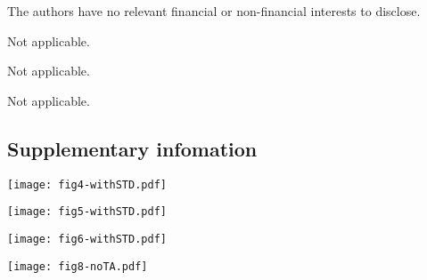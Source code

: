 \documentclass[pdflatex,referee,iicol,sn-basic]{sn-jnl}
\theoremstyle{thmstyleone}%
\theoremstyle{thmstyletwo}%
\theoremstyle{thmstylethree}%
\begin{document}
The authors have no relevant financial or non-financial interests to disclose.

Not applicable.

Not applicable.

Not applicable.

\begin{appendices}

\section{Supplementary infomation}\label{secA1}

\begin{figure*}%
    \centering
    \texttt{[image: fig4-withSTD.pdf]}
    \caption{}
    \label{sfig4}
\end{figure*}

\begin{figure*}%
    \centering
    \texttt{[image: fig5-withSTD.pdf]}
    \caption{}
    \label{sfig5}
\end{figure*}

\begin{figure*}%
    \centering
    \texttt{[image: fig6-withSTD.pdf]}
    \caption{}
    \label{sfig6}
\end{figure*}

\begin{figure*}%
    \centering
    \texttt{[image: fig8-noTA.pdf]}
    \caption{}
    \label{sfig8}
\end{figure*}




\end{appendices}
\end{document}
